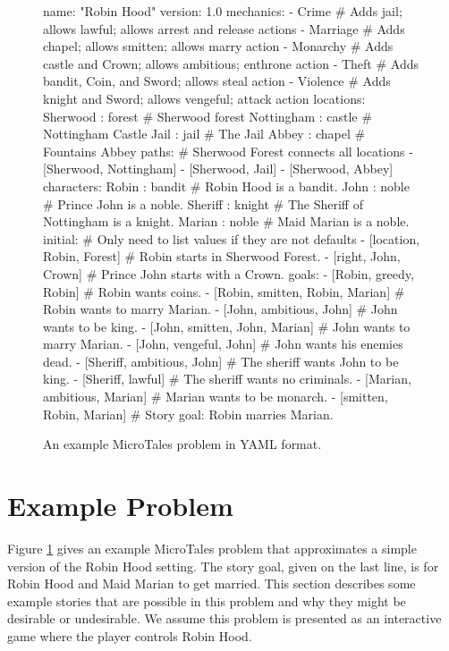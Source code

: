 \documentclass{nilreport}
\begin{document}
\newpage

\begin{figure}[!ht]
{\small
\begin{code}
name: "Robin Hood"
version: 1.0
mechanics:
- Crime    # Adds jail; allows lawful; allows arrest and release actions
- Marriage # Adds chapel; allows smitten; allows marry action
- Monarchy # Adds castle and Crown; allows ambitious; enthrone action
- Theft    # Adds bandit, Coin, and Sword; allows steal action
- Violence # Adds knight and Sword; allows vengeful; attack action
locations:
  Sherwood : forest   # Sherwood forest
  Nottingham : castle # Nottingham Castle
  Jail : jail         # The Jail
  Abbey : chapel      # Fountains Abbey
paths: # Sherwood Forest connects all locations
- [Sherwood, Nottingham]
- [Sherwood, Jail]
- [Sherwood, Abbey]
characters:
  Robin : bandit   # Robin Hood is a bandit.
  John : noble     # Prince John is a noble.
  Sheriff : knight # The Sheriff of Nottingham is a knight.
  Marian : noble   # Maid Marian is a noble.
initial: # Only need to list values if they are not defaults
- [location, Robin, Forest] # Robin starts in Sherwood Forest.
- [right, John, Crown]      # Prince John starts with a Crown.
goals:
- [Robin, greedy, Robin]           # Robin wants coins.
- [Robin, smitten, Robin, Marian]  # Robin wants to marry Marian.
- [John, ambitious, John]          # John wants to be king.
- [John, smitten, John, Marian]    # John wants to marry Marian.
- [John, vengeful, John]           # John wants his enemies dead.
- [Sheriff, ambitious, John]       # The sheriff wants John to be king.
- [Sheriff, lawful]                # The sheriff wants no criminals.
- [Marian, ambitious, Marian]      # Marian wants to be monarch.
- [smitten, Robin, Marian]         # Story goal: Robin marries Marian.
\end{code}}
\vspace{-1em}
\caption{An example MicroTales problem in YAML format.}
\label{fig:problemex}
\end{figure}

\section{Example Problem}

Figure \ref{fig:problemex} gives an example MicroTales problem that approximates a simple version of the Robin Hood setting. The story goal, given on the last line, is for Robin Hood and Maid Marian to get married. This section describes some example stories that are possible in this problem and why they might be desirable or undesirable. We assume this problem is presented as an interactive game where the player controls Robin Hood.
\end{document}
